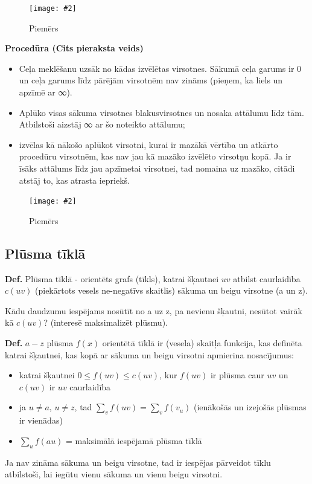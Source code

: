 \documentclass{article}
\newcommand{\illustration}[3]{
	\begin{figure}[H]
		\centering	
		\texttt{[image: \#2]}
		\caption{#3}
	\end{figure}
}
\begin{document}
\illustration{1}{daikstra-1}{Piemērs}

\textbf{Procedūra (Cits pieraksta veids)}

\begin{itemize}
	\item Ceļa meklēšanu uzsāk no kādas izvēlētas virsotnes. Sākumā ceļa garums ir 0 un ceļa garums līdz pārējām virsotnēm nav zināms (pieņem, ka liels un apzīmē ar ∞).
	\item Aplūko visas sākuma virsotnes blakusvirsotnes un nosaka attālumu līdz tām.  Atbilstoši aizstāj ∞ ar šo noteikto attālumu;
	\item izvēlas kā nākošo aplūkot virsotni, kurai ir mazākā vērtība un atkārto procedūru virsotnēm, kas nav jau kā mazāko izvēlēto virsotņu kopā. Ja ir īsāks attālums līdz jau apzīmetai virsotnei, tad nomaina uz mazāko, citādi atstāj to, kas atrasta iepriekš.
\end{itemize}
	
\illustration{1}{daikstra-2}{Piemērs}

\subsection{Plūsma tīklā}

\textbf{Def.} Plūsma tīklā - orientēts grafs (tīkls), katrai šķautnei $uv$ atbilst caurlaidība $c(uv)$ (piekārtots vesels ne-negatīvs skaitlis) sākuma un beigu virsotne (a un z).

Kādu daudzumu iespējams nosūtīt no a uz z, pa nevienu šķautni, nesūtot vairāk kā $c(uv)$? (interesē maksimalizēt plūsmu).

\textbf{Def.} $a-z$ plūsma $f(x)$ orientētā tīklā ir (vesela) skaitļa funkcija, kas definēta katrai šķautnei, kas kopā ar sākuma un beigu virsotni apmierina nosacījumus:
\begin{itemize}
	\item katrai šķautnei $0 \le f(uv) \le c(uv) $, kur $f(uv)$ ir plūsma caur $uv$ un $c(uv)$ ir $uv$ caurlaidība
	\item ja $u \ne a$, $u \ne z$, tad $\sum_{v}{f(uv)} = \sum_{v}{f(v_u)}$ (ienākošās un izejošās plūsmas ir vienādas)
	\item $\sum_{u}{f(au)}$ = maksimālā iespējamā plūsma tīklā
\end{itemize}

Ja nav zināma sākuma un beigu virsotne, tad ir iespējas pārveidot tīklu atbilstoši, lai iegūtu vienu sākuma un vienu beigu virsotni.
\end{document}
